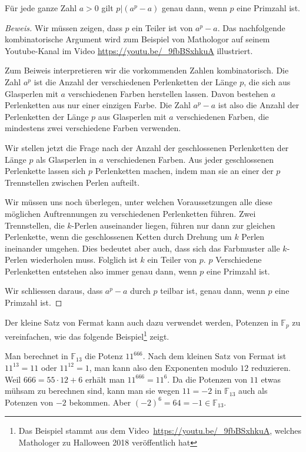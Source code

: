 \begin{satz}
Für jede ganze Zahl $a>0$ gilt $p|(a^p-a)$ genau dann, wenn
$p$ eine Primzahl ist.
\end{satz}

\begin{proof}[Beweis]
Wir müssen zeigen, dass $p$ ein Teiler ist von $a^p-a$.
Das nachfolgende kombinatorische Argument wird zum Beispiel
von Mathologor auf seinem Youtube-Kanal im Video
\url{https://youtu.be/_9fbBSxhkuA} illustriert.

Zum Beiweis interpretieren wir die vorkommenden Zahlen kombinatorisch.
Die Zahl $a^p$ ist die Anzahl der verschiedenen Perlenketten der Länge
$p$, die sich aus Glasperlen mit $a$ verschiedenen Farben herstellen
lassen.
Davon bestehen $a$ Perlenketten aus nur einer einzigen Farbe.
Die Zahl $a^p-a$ ist also die Anzahl der Perlenketten der Länge $p$
aus Glasperlen mit $a$ verschiedenen Farben, die mindestens zwei
verschiedene Farben verwenden.

Wir stellen jetzt die Frage nach der Anzahl der geschlossenen
Perlenketten der Länge $p$ als Glasperlen in $a$ verschiedenen Farben.
Aus jeder geschlossenen Perlenkette lassen sich $p$ Perlenketten machen,
indem man sie an einer der $p$ Trennstellen zwischen Perlen aufteilt.

Wir müssen uns noch überlegen, unter welchen Voraussetzungen 
alle diese möglichen Auftrennungen zu verschiedenen Perlenketten
führen.
Zwei Trennstellen, die $k$-Perlen auseinander liegen, führen nur dann
zur gleichen Perlenkette, wenn die geschlossenen Ketten durch Drehung 
um $k$ Perlen ineinander umgehen.
Dies bedeutet aber auch, dass sich das Farbmuster alle $k$-Perlen
wiederholen muss.
Folglich ist $k$ ein Teiler von $p$.
$p$ Verschiedene Perlenketten entstehen also immer genau dann, wenn $p$
eine Primzahl ist.

Wir schliessen daraus, dass $a^p-a$ durch $p$ teilbar ist, genau dann,
wenn $p$ eine Primzahl ist.
\end{proof}

Der kleine Satz von Fermat kann auch dazu verwendet werden, Potenzen 
in $\mathbb{F}_p$ zu vereinfachen, wie das folgende Beispiel\footnote{%
Das Beispiel stammt aus dem Video~\url{https://youtu.be/_9fbBSxhkuA},
welches Mathologer zu Halloween 2018 veröffentlich hat}
zeigt.

\begin{beispiel}
Man berechnet in $\mathbb{F}_{13}$ die Potenz $11^{666}$.
Nach dem kleinen Satz von Fermat ist $11^{13} = 11$ oder $11^{12}=1$,
man kann also den Exponenten modulo $12$ reduzieren.
Weil $666=55\cdot 12 + 6$ erhält man $11^{666}= 11^6$.
Da die Potenzen von $11$ etwas mühsam zu berechnen sind,
kann man sie wegen $11=-2$ in $\mathbb{F}_{13}$ auch als Potenzen
von $-2$ bekommen.
Aber $(-2)^6 = 64 = -1 \in\mathbb{F}_{13}$.
\end{beispiel}


